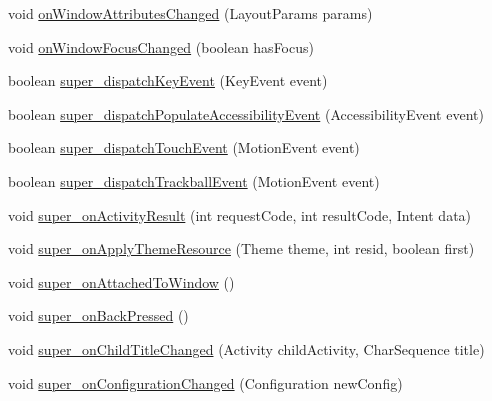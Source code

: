 \begin{DoxyCompactItemize}
\item 
void \hyperlink{classorg_1_1qtproject_1_1qt5_1_1android_1_1bindings_1_1_qt_activity_af881fa829fb552af632f8b1bba96f351}{on\-Window\-Attributes\-Changed} (Layout\-Params params)
\item 
void \hyperlink{classorg_1_1qtproject_1_1qt5_1_1android_1_1bindings_1_1_qt_activity_ab161d356ebf5044a00182ffaf79d3437}{on\-Window\-Focus\-Changed} (boolean has\-Focus)
\item 
boolean \hyperlink{classorg_1_1qtproject_1_1qt5_1_1android_1_1bindings_1_1_qt_activity_a0222dd1edd412d5573914d8e563d8dfc}{super\-\_\-dispatch\-Key\-Event} (Key\-Event event)
\item 
boolean \hyperlink{classorg_1_1qtproject_1_1qt5_1_1android_1_1bindings_1_1_qt_activity_a174082c8c4aa301a2a8c78ce237bca22}{super\-\_\-dispatch\-Populate\-Accessibility\-Event} (Accessibility\-Event event)
\item 
boolean \hyperlink{classorg_1_1qtproject_1_1qt5_1_1android_1_1bindings_1_1_qt_activity_a8525630fd66e1d88e94f7bc9457bbd1b}{super\-\_\-dispatch\-Touch\-Event} (Motion\-Event event)
\item 
boolean \hyperlink{classorg_1_1qtproject_1_1qt5_1_1android_1_1bindings_1_1_qt_activity_a84a82b3eb7dd352d126c55272c64264a}{super\-\_\-dispatch\-Trackball\-Event} (Motion\-Event event)
\item 
void \hyperlink{classorg_1_1qtproject_1_1qt5_1_1android_1_1bindings_1_1_qt_activity_a03bf6f3f50c07592cbee97ce9ebdb315}{super\-\_\-on\-Activity\-Result} (int request\-Code, int result\-Code, Intent data)
\item 
void \hyperlink{classorg_1_1qtproject_1_1qt5_1_1android_1_1bindings_1_1_qt_activity_a03b4db053b9528617c37bab2d47fc803}{super\-\_\-on\-Apply\-Theme\-Resource} (Theme theme, int resid, boolean first)
\item 
void \hyperlink{classorg_1_1qtproject_1_1qt5_1_1android_1_1bindings_1_1_qt_activity_a7155f32de8ac1f383e18250f28cd1f97}{super\-\_\-on\-Attached\-To\-Window} ()
\item 
void \hyperlink{classorg_1_1qtproject_1_1qt5_1_1android_1_1bindings_1_1_qt_activity_a84b318d75dea61b3aa2743fb475c90da}{super\-\_\-on\-Back\-Pressed} ()
\item 
void \hyperlink{classorg_1_1qtproject_1_1qt5_1_1android_1_1bindings_1_1_qt_activity_ac369eb38a2ea1f7a0d61c44a30d63620}{super\-\_\-on\-Child\-Title\-Changed} (Activity child\-Activity, Char\-Sequence title)
\item 
void \hyperlink{classorg_1_1qtproject_1_1qt5_1_1android_1_1bindings_1_1_qt_activity_a1c7f2e1b1ce16f2bfa70f38d88740565}{super\-\_\-on\-Configuration\-Changed} (Configuration new\-Config)

\end{DoxyCompactItemize}

